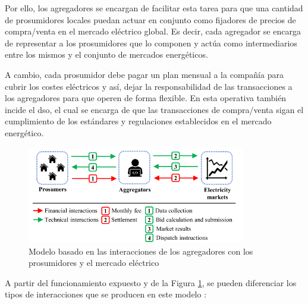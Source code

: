 Por ello, los agregadores \cite{bidding} \cite{transactive} se encargan de facilitar esta tarea para que una cantidad de prosumidores locales puedan actuar en conjunto como fijadores de precios de compra/venta en el mercado eléctrico global. Es decir, cada agregador se encarga de representar a los prosumidores que lo componen y actúa como intermediarios entre los mismos y el conjunto de mercados energéticos. 

\vspace{3mm}

A cambio, cada prosumidor debe pagar un plan mensual a la compañía para cubrir los costes eléctricos y así, dejar la responsabilidad de las transacciones a los agregadores para que operen de forma flexible. En esta operativa también incide el \gls{dso}, el cual se encarga de que las transacciones de compra/venta sigan el cumplimiento de los estándares y regulaciones establecidos en el mercado energético. 
\vspace{3mm}

\begin{figure}[h]
  \centering
  \includegraphics[width=0.85\textwidth]{img/teoria/market.png}
  \caption{Modelo basado en las interacciones de los agregadores con los prosumidores y el mercado eléctrico \cite{business}}
  \label{fig:market}
\end{figure}

\vspace{3mm}

A partir del funcionamiento expuesto y de la Figura \ref{fig:market}, se pueden diferenciar los tipos de interacciones que se producen en este modelo \cite{business}:

